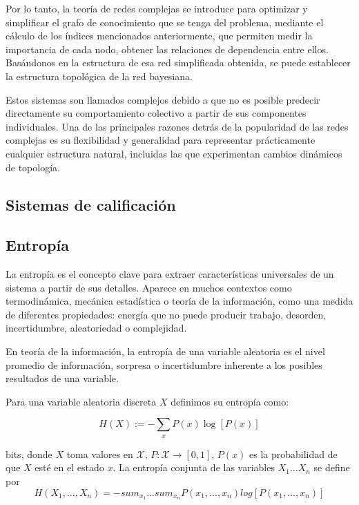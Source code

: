 Por lo tanto, la teoría de redes complejas se introduce para optimizar y simplificar el grafo de conocimiento que 
se tenga del problema, mediante el cálculo de los índices mencionados anteriormente, que permiten medir la importancia de cada nodo, obtener 
las relaciones de dependencia entre ellos. Basándonos en la estructura de esa red simplificada obtenida, 
se puede establecer la estructura topológica de la red bayesiana\cite{Bai_Xing_Wu_2022}.

Estos sistemas son llamados complejos debido a que no es posible predecir directamente su 
comportamiento colectivo a partir de sus componentes individuales. Una de las principales razones detrás de 
la popularidad de las redes complejas es su flexibilidad
y generalidad para representar prácticamente cualquier estructura natural, incluidas las que experimentan 
cambios dinámicos de topología\cite{CN-review}.

\subsection{Sistemas de calificación}



\subsection{Entropía}
La entropía es el concepto clave para extraer características universales de un sistema a partir de sus 
detalles. Aparece en muchos contextos como termodinámica, mecánica estadística o teoría de la información, como 
una medida de diferentes propiedades: energía que no puede producir trabajo, desorden, incertidumbre, 
aleatoriedad o complejidad\cite{gen-entr-review}.

En teoría de la información, la entropía de una variable aleatoria es el nivel promedio de información, 
sorpresa o incertidumbre inherente a los posibles resultados de una variable\cite{t-entropy}.
\begin{definicion}[Entropía]\label{def:entropy}
Para una variable aleatoria discreta $X$ definimos su entropía como:  

$$H(X):= - \sum_{x} P(x)\log[P(x)]$$

bits, donde $X$ toma valores en $\mathcal{X}$, $P:\mathcal{X} \rightarrow [0,1]$, $P(x)$ es la 
probabilidad de que $X$ esté en el estado $x$. La 
entropía conjunta de las variables $X_1...X_n$ se define por 
$$H(X_1,...,X_n)=-sum_{x_1}...sum_{x_n}P(x_1,...,x_n)log[P(x_1,...,x_n)]$$
\end{definicion}

